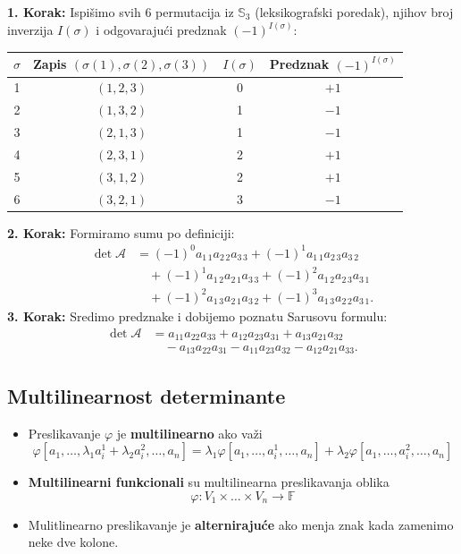 \documentclass[a4paper,12pt,twoside]{report}
\numberwithin{algorithm}{section}
\begin{document}
\noindent
\textbf{1. Korak:} Ispišimo svih 6 permutacija iz \( \mathbb{S}_3 \) (leksikografski poredak), njihov broj inverzija \( I(\sigma) \) i odgovarajući predznak \( (-1)^{I(\sigma)} \):
\begin{center}
\begin{tabular}{c|c|c|c}
\hline
\( \sigma \) & Zapis \( (\sigma(1), \sigma(2), \sigma(3)) \) & \( I(\sigma) \) & Predznak \( (-1)^{I(\sigma)} \) \\
\hline
1 & \( (1,2,3) \) & 0 & \( +1 \) \\
2 & \( (1,3,2) \) & 1 & \( -1 \) \\
3 & \( (2,1,3) \) & 1 & \( -1 \) \\
4 & \( (2,3,1) \) & 2 & \( +1 \) \\
5 & \( (3,1,2) \) & 2 & \( +1 \) \\
6 & \( (3,2,1) \) & 3 & \( -1 \) \\
\hline
\end{tabular}
\end{center}
\medskip
\noindent
\textbf{2. Korak:} Formiramo sumu po definiciji:
\begin{align*}
\det \mathcal{A}
&= 
(-1)^{0} a_{1\,1} a_{2\,2} a_{3\,3}
+ (-1)^{1} a_{1\,1} a_{2\,3} a_{3\,2} \\
&\quad + (-1)^{1} a_{1\,2} a_{2\,1} a_{3\,3}
+ (-1)^{2} a_{1\,2} a_{2\,3} a_{3\,1} \\
&\quad + (-1)^{2} a_{1\,3} a_{2\,1} a_{3\,2}
+ (-1)^{3} a_{1\,3} a_{2\,2} a_{3\,1}.
\end{align*}
\medskip
\noindent
\textbf{3. Korak:} Sredimo predznake i dobijemo poznatu Sarusovu formulu:
\[
\boxed{
\begin{aligned}
\det \mathcal{A} 
&= a_{11}a_{22}a_{33} + a_{12}a_{23}a_{31} + a_{13}a_{21}a_{32} \\
&\quad - a_{13}a_{22}a_{31} - a_{11}a_{23}a_{32} - a_{12}a_{21}a_{33}.
\end{aligned}
}
\]

\subsection{Multilinearnost determinante}
\begin{itemize}
    \item Preslikavanje $\varphi$ je \textbf{multilinearno} ako važi
    \[ \varphi [a_1, \dots, \lambda_1 a_i^1 + \lambda_2 a_i^2, \dots, a_n] = 
        \lambda_1 \varphi [a_1, \dots,a_i^1, \dots, a_n] +
        \lambda_2 \varphi [a_1, \dots, a_i^2, \dots, a_n] \]
    \item \textbf{Multilinearni funkcionali} su multilinearna preslikavanja oblika
    \[ \varphi: V_1 \times \dots \times V_n \to \mathbb{F} \]
    \item Mulitlinearno preslikavanje je \textbf{alternirajuće} ako menja znak kada zamenimo neke dve kolone.
\end{itemize}
\end{document}
